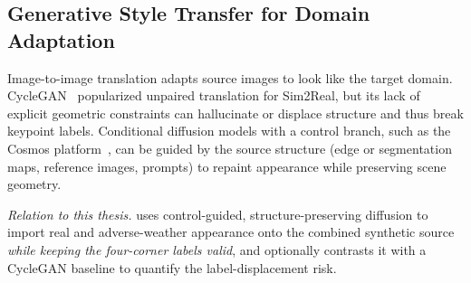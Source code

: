 \subsection{Generative Style Transfer for Domain Adaptation}
\label{subsec:rw-style}
Image-to-image translation adapts source images to look like the target domain.
CycleGAN~\cite{zhu2017cyclegan} popularized unpaired translation for Sim2Real, but its
lack of explicit geometric constraints can hallucinate or displace structure and thus
break keypoint labels. Conditional diffusion models with a control branch, such as the
Cosmos platform~\cite{nvidia2025cosmos}, can be guided by the source structure (edge or
segmentation maps, reference images, prompts) to repaint appearance while preserving
scene geometry.

\emph{Relation to this thesis.}  uses control-guided,
structure-preserving diffusion to import real and adverse-weather appearance onto the
combined synthetic source \emph{while keeping the four-corner labels valid}, and
optionally contrasts it with a CycleGAN baseline to quantify the label-displacement risk.
